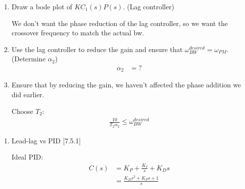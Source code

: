 \begin{enumerate}
\begin{enumerate}
\begin{itemize}
\begin{enumerate}
                            \item Draw a bode plot of $KC_1(s) P(s)$. (Lag controller)

                                We don't want the phase reduction of the lag controller, so we want the crossover frequency to match the actual bw.

                            \item Use the lag controller to reduce the gain and ensure that $\omega_{BW}^{desired} = \omega_{PM}$. (Determine $\alpha_2$)
                                \begin{align*}
                                    \alpha_2 &= ?
                                \end{align*}
                            \item Ensure that by reducing the gain, we haven't affected the phase addition we did earlier.

                                Choose $T_2$:
                                \begin{align*}
                                    \frac{10}{T_2 \alpha_2} \le \omega_{BW}^{desired}
                                \end{align*}
                        \end{enumerate}
                \end{itemize}
                \begin{enumerate}
                    \item Lead-lag vs PID [7.5.1]

                        Ideal PID:
                        \begin{align*}
                            C(s) &= K_P + \frac{K_I}{s} + K_Ds \\
                            &= \frac{K_D s^2 + K_P s + 1}{s}
                        \end{align*}
                \end{enumerate}
        \end{enumerate}
\end{enumerate}

\newpage
\appendix


